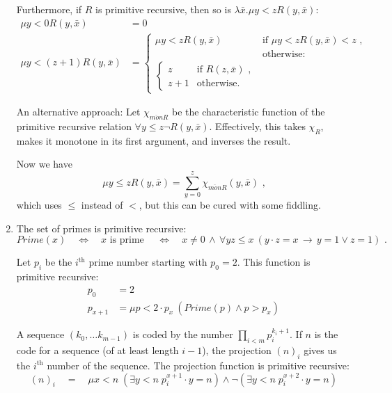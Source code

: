 \documentclass[a4paper,11pt]{article}
\begin{document}
\begin{enumerate}
Furthermore, if $R$ is primitive recursive, then so is $\lambda \bar{x}. \mu y \! < \! z R(y, \bar{x})$:
\begin{align*}
  \mu y \! < \! 0 R(y, \bar{x})             &= 0\\
  \mu y \! < \! (z \! + \! 1) R(y, \bar{x}) &=
  \begin{cases}
    \mu y \! < \! z R(y, \bar{x}) & \text{if $\mu y \! < \! z R(y, \bar{x}) < z$ ,}\\
                                  & \text{otherwise:}\\
    \begin{cases}
       z     & \text{if $R(z, \bar{x})$ ,}\\
       z + 1 & \text{otherwise.}
    \end{cases}
  \end{cases}
\end{align*}

An alternative approach: Let $\chi_{\overline{mon}R}$ be the characteristic function of the
primitive recursive relation $\forall y \! \leq \! z \neg R(y, \bar{x})$.
Effectively, this takes $\chi_R$, makes it monotone in its first argument,
and inverses the result.

Now we have
\begin{equation*}
  \mu y \! \leq \! z R(y, \bar{x}) = \sum^{z}_{y=0} \chi_{\overline{mon}R}(y, \bar{x}) \text{ ,}
\end{equation*}
which uses $\leq$ instead of $<$, but this can be cured with some fiddling.


\item %
The set of primes is primitive recursive:
\begin{equation*}
  Prime(x) \quad \Leftrightarrow \quad
  x \text{ is prime } \quad \Leftrightarrow \quad
  x \neq 0 \, \wedge \, \forall y z \! \leq \! x \: (y \! \cdot \! z = x \, \rightarrow \, y = 1 \vee z = 1) \text{ .}
\end{equation*}

Let $p_i$ be the $i^{\text{th}}$ prime number starting with $p_0 = 2$.
This function is primitive recursive:
\begin{align*}
  p_0    &= 2 \\
  p_{x+1} &= \mu p \! < \! 2 \! \cdot \! p_x \: (Prime(p) \wedge p > p_x)
\end{align*}


A sequence $(k_0, \ldots k_{m\!-\!1})$ is coded by the number $\prod_{i<m} p_i^{k_i+1}$.
If $n$ is the code for a sequence (of at least length $i-1$), the projection
$(n)_i$ gives us the $i^\text{th}$ number of the sequence.
The projection function is primitive recursive:
\begin{equation*}
  (n)_i \quad = \quad \mu x \! < \! n \; ( \exists y \! < \! n \; p_i^{x+1} \cdot y = n ) \wedge \neg ( \exists y \! < \! n \; p_i^{x+2} \cdot y = n )
\end{equation*}


\end{enumerate}
\end{document}
